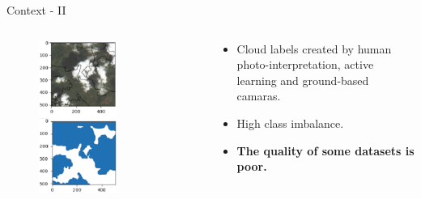 \begin{frame}{Context - II}
	\begin{columns}
		\begin{column}{0.5\textwidth}
			\begin{figure}
				\includegraphics[width=0.6\textwidth]{images/contex_III.png}
				\label{fig:introfig02}
			\end{figure}	
		\end{column}
		\begin{column}{0.5\textwidth}
			\begin{itemize}
				\item Cloud labels created by human photo-interpretation, active learning and ground-based camaras.
				\item High class imbalance.
				\item \textbf{The quality of some datasets is poor.}
			\end{itemize}
		\end{column}
	\end{columns}
\end{frame}





